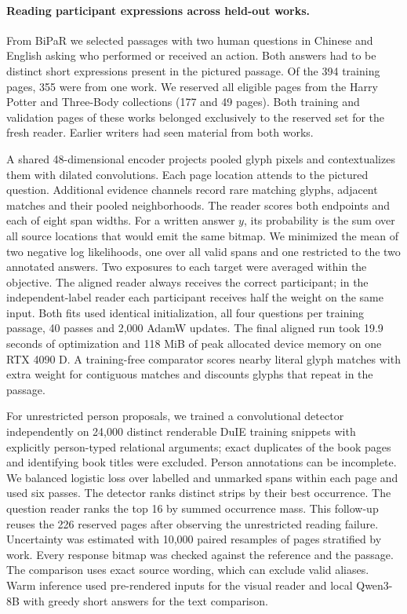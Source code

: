 \documentclass[12pt,a4paper]{article}
\providecommand{\DIFadd}[1]{{\protect\color{blue} \sf #1}} %
\begin{document}
\paragraph{\DIFadd{Reading participant expressions across held-out works.}}
\DIFadd{From BiPaR we selected passages with two human questions in Chinese and English asking who performed or received an action. Both answers had to be distinct short expressions present in the pictured passage. Of the 394 training pages, 355 were from one work. We reserved all eligible pages from the Harry Potter and Three-Body collections (177 and 49 pages). Both training and validation pages of these works belonged exclusively to the reserved set for the fresh reader. Earlier writers had seen material from both works.
}

\DIFadd{A shared 48-dimensional encoder projects pooled glyph pixels and contextualizes them with dilated convolutions. Each page location attends to the pictured question. Additional evidence channels record rare matching glyphs, adjacent matches and their pooled neighborhoods. The reader scores both endpoints and each of eight span widths. For a written answer $y$, its probability is the sum over all source locations that would emit the same bitmap. We minimized the mean of two negative log likelihoods, one over all valid spans and one restricted to the two annotated answers. Two exposures to each target were averaged within the objective. The aligned reader always receives the correct participant; in the independent-label reader each participant receives half the weight on the same input. Both fits used identical initialization, all four questions per training passage, 40 passes and 2,000 AdamW updates. The final aligned run took 19.9 seconds of optimization and 118 MiB of peak allocated device memory on one RTX 4090 D. A training-free comparator scores nearby literal glyph matches with extra weight for contiguous matches and discounts glyphs that repeat in the passage.
}

\DIFadd{For unrestricted person proposals, we trained a convolutional detector independently on 24,000 distinct renderable DuIE training snippets with explicitly person-typed relational arguments; exact duplicates of the book pages and identifying book titles were excluded. Person annotations can be incomplete. We balanced logistic loss over labelled and unmarked spans within each page and used six passes. The detector ranks distinct strips by their best occurrence. The question reader ranks the top 16 by summed occurrence mass. This follow-up reuses the 226 reserved pages after observing the unrestricted reading failure. Uncertainty was estimated with 10,000 paired resamples of pages stratified by work. Every response bitmap was checked against the reference and the passage. The comparison uses exact source wording, which can exclude valid aliases. Warm inference used pre-rendered inputs for the visual reader and local Qwen3-8B with greedy short answers for the text comparison.
}
\end{document}

